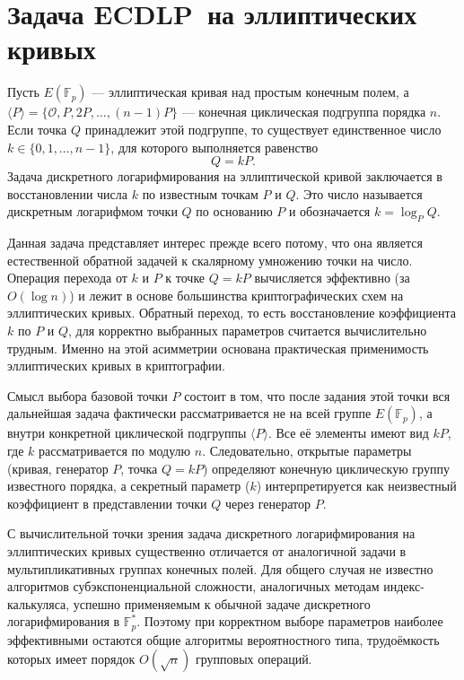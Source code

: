 \section[Задача ECDLP]{Задача ECDLP\ на эллиптических кривых}

Пусть $E(\mathbb{F}_p)$ --- эллиптическая кривая над простым конечным полем, а $\langle P\rangle=\{\mathcal{O},P,2P,\dots,(n-1)P\}$ --- конечная циклическая подгруппа порядка $n$. Если точка $Q$ принадлежит этой подгруппе, то существует единственное число $k \in \{0,1,\dots,n-1\}$, для которого выполняется равенство
\[
Q=kP.
\]
Задача дискретного логарифмирования на эллиптической кривой заключается в восстановлении числа $k$ по известным точкам $P$ и $Q$. Это число называется дискретным логарифмом точки $Q$ по основанию $P$ и обозначается $k=\log_PQ$.

Данная задача представляет интерес прежде всего потому, что она является естественной обратной задачей к скалярному умножению точки на число. Операция перехода от $k$ и $P$ к точке $Q=kP$ вычисляется эффективно (за $O(\log n)$) и лежит в основе большинства криптографических схем на эллиптических кривых. Обратный переход, то есть восстановление коэффициента $k$ по $P$ и $Q$, для корректно выбранных параметров считается вычислительно трудным. Именно на этой асимметрии основана практическая применимость эллиптических кривых в криптографии.

Смысл выбора базовой точки $P$ состоит в том, что после задания этой точки вся дальнейшая задача фактически рассматривается не на всей группе $E(\mathbb{F}_p)$, а внутри конкретной циклической подгруппы $\langle P\rangle$. Все её элементы имеют вид $kP$, где $k$ рассматривается по модулю $n$. Следовательно, открытые параметры (кривая, генератор $P$, точка $Q=kP$) определяют конечную циклическую группу известного порядка, а секретный параметр ($k$) интерпретируется как неизвестный коэффициент в представлении точки $Q$ через генератор $P$.

С вычислительной точки зрения задача дискретного логарифмирования на эллиптических кривых существенно отличается от аналогичной задачи в мультипликативных группах конечных полей. Для общего случая не известно алгоритмов субэкспоненциальной сложности, аналогичных методам индекс-калькуляса, успешно применяемым к обычной задаче дискретного логарифмирования в $\mathbb{F}_p^*$. Поэтому при корректном выборе параметров наиболее эффективными остаются общие алгоритмы вероятностного типа, трудоёмкость которых имеет порядок $O(\sqrt{n})$ групповых операций.